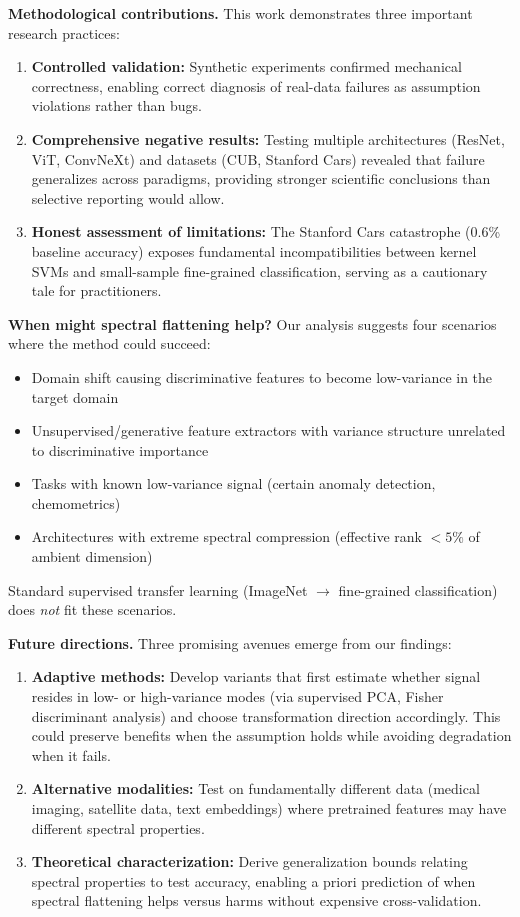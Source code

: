 \documentclass[11pt]{article}
\begin{document}
\textbf{Methodological contributions.} This work demonstrates three important research practices:
\begin{enumerate}
    \item \textbf{Controlled validation:} Synthetic experiments confirmed mechanical correctness, enabling correct diagnosis of real-data failures as assumption violations rather than bugs.
    \item \textbf{Comprehensive negative results:} Testing multiple architectures (ResNet, ViT, ConvNeXt) and datasets (CUB, Stanford Cars) revealed that failure generalizes across paradigms, providing stronger scientific conclusions than selective reporting would allow.
    \item \textbf{Honest assessment of limitations:} The Stanford Cars catastrophe (0.6\% baseline accuracy) exposes fundamental incompatibilities between kernel SVMs and small-sample fine-grained classification, serving as a cautionary tale for practitioners.
\end{enumerate}

\textbf{When might spectral flattening help?} Our analysis suggests four scenarios where the method could succeed:
\begin{itemize}
    \item Domain shift causing discriminative features to become low-variance in the target domain
    \item Unsupervised/generative feature extractors with variance structure unrelated to discriminative importance
    \item Tasks with known low-variance signal (certain anomaly detection, chemometrics)
    \item Architectures with extreme spectral compression (effective rank $< 5\%$ of ambient dimension)
\end{itemize}
Standard supervised transfer learning (ImageNet $\to$ fine-grained classification) does \emph{not} fit these scenarios.

\textbf{Future directions.} Three promising avenues emerge from our findings:
\begin{enumerate}
    \item \textbf{Adaptive methods:} Develop variants that first estimate whether signal resides in low- or high-variance modes (via supervised PCA, Fisher discriminant analysis) and choose transformation direction accordingly. This could preserve benefits when the assumption holds while avoiding degradation when it fails.
    \item \textbf{Alternative modalities:} Test on fundamentally different data (medical imaging, satellite data, text embeddings) where pretrained features may have different spectral properties.
    \item \textbf{Theoretical characterization:} Derive generalization bounds relating spectral properties to test accuracy, enabling a priori prediction of when spectral flattening helps versus harms without expensive cross-validation.
\end{enumerate}
\end{document}
